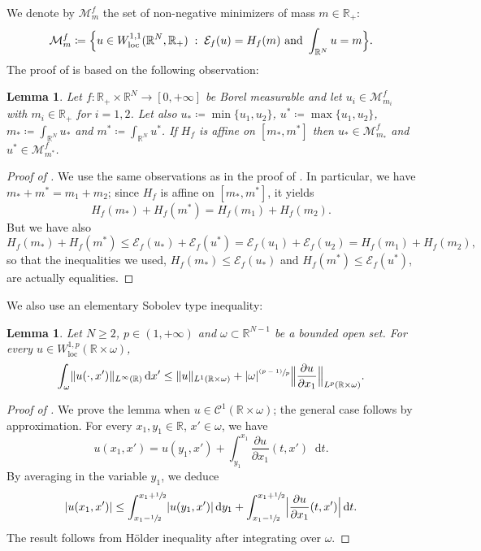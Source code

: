 \documentclass[10pt]{amsart}
\newcommand{\psfrac}[2]{{\sfrac{(#1)}{#2}}}
\newcommand{\Babs}[1]{\Bigl\vert#1\Bigr\vert}
\newcommand{\Bnorm}[1]{\Bigl\Vert#1\Bigr\Vert}
\theoremstyle{plain}
\newtheorem{lemma}[theorem]{Lemma}
\theoremstyle{definition}
\newcommand{\dd}{\mathop{}\mathopen{}\mathrm{d}}
\newcommand{\R}{\mathbb{R}}
\newcommand{\Cspace}{\mathscr{C}}
\newcommand{\ener}{\mathcal{E}}
\newcommand{\loc}{\mathrm{loc}}
\newcommand{\st}{\;:\;}
\DeclarePairedDelimiter{\abs}{\lvert}{\rvert}
\DeclarePairedDelimiter{\norm}{\lVert}{\rVert}
\begin{document}
We denote by \(\mathcal{M}^f_m\) the set of non-negative minimizers of mass \(m\in\R_+\):
\begin{equation}
\mathcal{M}^f_m\coloneqq \Bigl\{u\in W^{1,1}_\loc(\R^N,\R_+)\st \ener_f(u)=H_f(m)\text{ and }\int_{\R^N}u=m\Bigr\}.
\end{equation}
The proof of  is based on the following observation:
\begin{lemma}\label{lemmaOptimalitySupInf}
Let \(f:\R_+\times\R^N\to[0,+\infty]\) be Borel measurable and let \(u_i\in\mathcal{M}^f_{m_i}\) with \(m_i\in\R_+\) for \(i=1,2\). Let also \(u_\ast\coloneqq \min\{u_1,u_2\}\), \(u^\ast\coloneqq \max\{u_1,u_2\}\), \(m_\ast\coloneqq \int_{\R^N}u_\ast\) and \(m^\ast\coloneqq \int_{\R^N}u^\ast\). If \(H_f\) is affine on \([m_\ast,m^\ast]\) then \(u_\ast\in\mathcal{M}^f_{m_\ast}\) and \(u^\ast\in\mathcal{M}^f_{m^\ast}\).
\end{lemma}
\begin{proof}[Proof of ]
We use the same observations as in the proof of . In particular, we have \(m_\ast+m^\ast=m_1+m_2\); since \(H_f\) is affine on \([m_\ast,m^\ast]\), it yields
\[
H_f(m_\ast)+H_f(m^\ast)=H_f(m_1)+H_f(m_2).
\]
But we have also
\[
H_f(m_\ast)+H_f(m^\ast)\leq\ener_f(u_\ast)+\ener_f(u^\ast)=\ener_f(u_1)+\ener_f(u_2)=H_f(m_1)+H_f(m_2),
\]
so that the inequalities we used, \ie \(H_f(m_\ast)\leq\ener_f(u_\ast)\) and \(H_f(m^\ast)\leq\ener_f(u^\ast)\), are actually equalities.
\end{proof}
We also use an elementary Sobolev type inequality:
\begin{lemma}\label{lemmaSobolevInfinityLp}
Let \(N\geq 2\), \(p\in (1,+\infty)\) and \(\omega\subset\R^{N-1}\) be a bounded open set. For every \(u\in W_\loc^{1,p}(\R\times\omega)\),
\[
\int_\omega\norm{u(\cdot,x')}_{L^\infty(\R)}\dd x'\leq\norm{u}_{L^1(\R\times\omega)}+\abs{\omega}^{\psfrac{p-1}{p}}
\Bnorm{\frac{\partial u}{\partial x_1}}_{L^p(\R\times\omega)}.
\]
\end{lemma}
\begin{proof}[Proof of ]
We prove the lemma when \(u\in\Cspace^1(\R\times\omega)\); the general case follows by approximation. For every \(x_1,y_1\in\R\), \(x'\in\omega\), we have
\[
u(x_1,x')=u(y_1,x')+\int_{y_1}^{x_1}\frac{\partial u}{\partial x_1}(t,x')\dd t.
\]
By averaging in the variable \(y_1\), we deduce
\[
\abs{u(x_1,x')}\leq \int_{x_1-\sfrac 12}^{x_1+\sfrac 12}\abs{u(y_1,x')}\dd y_1+\int_{x_1-\sfrac 12}^{x_1+\sfrac 12}\Babs{\frac{\partial u}{\partial x_1}(t,x')}\dd t.
\]
The result follows from Hölder inequality after integrating over \(\omega\).
\end{proof}
\end{document}
